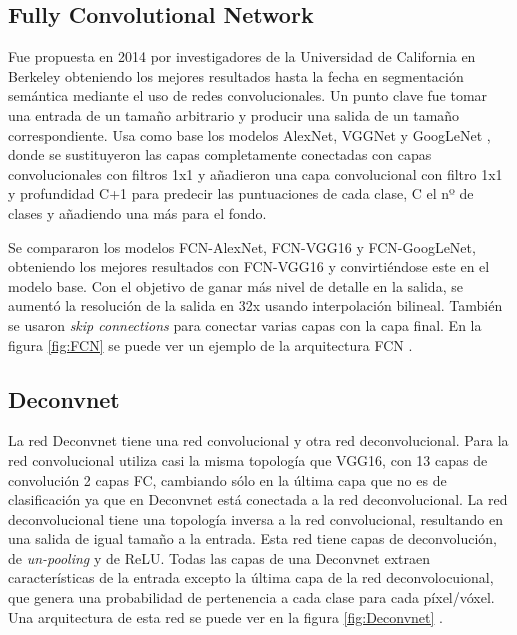 \subsection{Fully Convolutional Network}

Fue propuesta en 2014 por investigadores de la Universidad de California en Berkeley \cite{Long2014} obteniendo los mejores resultados hasta la fecha en segmentación semántica mediante el uso de redes convolucionales. Un punto clave fue tomar una entrada de un tamaño arbitrario y producir una salida de un tamaño correspondiente. Usa como base los modelos AlexNet, VGGNet y GoogLeNet \cite{Szegedy2014}, donde se sustituyeron las capas completamente conectadas con capas convolucionales con filtros 1x1 y añadieron una capa convolucional con filtro 1x1 y profundidad C+1 para predecir las puntuaciones de cada clase, C el nº de clases y añadiendo una más para el fondo.

Se compararon los modelos FCN-AlexNet, FCN-VGG16 y FCN-GoogLeNet, obteniendo los mejores resultados con FCN-VGG16 y convirtiéndose este en el modelo base. Con el objetivo de ganar más nivel de detalle en la salida, se aumentó la resolución de la salida en 32x usando interpolación bilineal. También se usaron \textit{skip connections} para conectar varias capas con la capa final. En la figura \ref{fig:FCN} se puede ver un ejemplo de la arquitectura FCN \cite{Sultana2020}.



\subsection{Deconvnet}

La red Deconvnet \cite{Noh2015} tiene una red convolucional y otra red deconvolucional. Para la red convolucional utiliza casi la misma topología que VGG16, con 13 capas de convolución 2 capas FC, cambiando sólo en la última capa que no es de clasificación ya que en Deconvnet está conectada a la red deconvolucional. La red deconvolucional tiene una topología inversa a la red convolucional, resultando en una salida de igual tamaño a la entrada. Esta red tiene capas de deconvolución, de \textit{un-pooling} y de ReLU. Todas las capas de una Deconvnet extraen características de la entrada excepto la última capa de la red deconvolocuional, que genera una probabilidad de pertenencia a cada clase para cada píxel/vóxel. Una arquitectura de esta red se puede ver en la figura \ref{fig:Deconvnet} \cite{Noh2015}.

